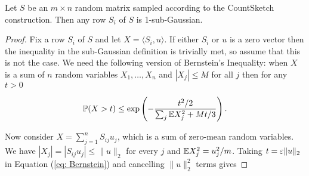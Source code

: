 \begin{Lemma}
  Let $S$ be an $m \times n$ random matrix sampled according to the CountSketch
  construction.
  Then any row $S_i$ of $S$ is 1-sub-Gaussian.
\end{Lemma}

\begin{proof}
Fix a row $S_i$ of $S$ and let $X = \langle S_i, u \rangle$.
If either $S_i$ or $u$ is a zero vector then the
inequality in the sub-Gaussian definition is trivially met, so assume that
  this is not the case.
We need the following version of Bernstein's Inequality:
  when $X$ is a sum of $n$ random variables $X_1,\ldots,X_n$ and $|X_j| \le M$ for all $j$ then for
  any $t > 0$

  \begin{equation} \label{eq: Bernstein}
    \mathbb{P} (X > t) \le \exp \left( - \frac{t^2 / 2}{\sum_j \mathbb{E} X_j^2 + Mt/3
    } \right).
  \end{equation}

Now consider $X = \sum_{j=1}^n S_{ij} u_j$, which is a sum of zero-mean random variables.
We have $|X_j| = |S_{ij} u_j| \le \| u \|_2$ for every $j$ and $\mathbb{E} X_j^2 =
  u_j^2/m$.
  Taking $t = \varepsilon \| u \|_2$ in Equation (\ref{eq: Bernstein}) and cancelling
  $\| u \|_2^2$ terms gives


\end{proof}
